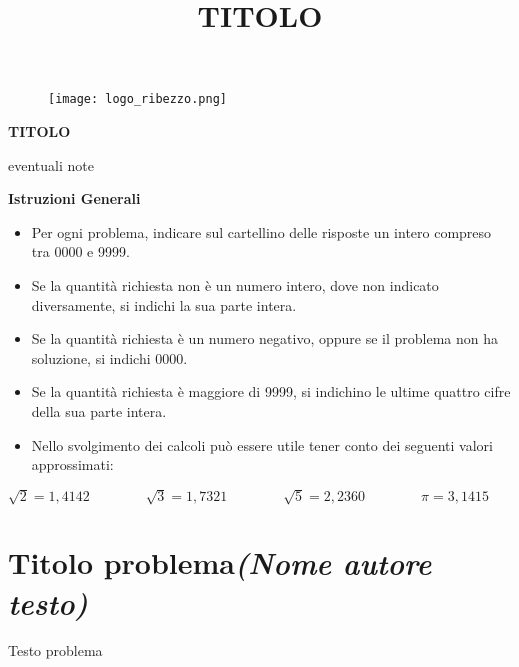 \documentclass[11pt]{article}
\date{}
\title{\textbf{TITOLO}}
\begin{document}
\begin{figure}
       \centering
       \texttt{[image: logo\_ribezzo.png]}
\end{figure}
\begin{center}
\huge\textbf{TITOLO}
\end{center}
\begin{center}
eventuali note


\end{center}
\begin{mdframed}
\begin{center}
\textbf{Istruzioni Generali}
\end{center}
\begin{itemize}
\item Per ogni problema, indicare sul cartellino delle risposte un intero compreso tra 0000 e 9999.
\item Se la quantità richiesta non è un numero intero, dove non indicato diversamente, si indichi la sua parte intera.
\item Se la quantità richiesta è un numero negativo, oppure se il problema non ha soluzione, si indichi 0000.
\item Se la quantità richiesta è maggiore di 9999, si indichino le ultime quattro cifre della sua parte intera.
\item Nello svolgimento dei calcoli può essere utile tener conto dei seguenti valori approssimati:
\end{itemize}

\begin{center}
$\sqrt2 = 1,4142 \qquad \qquad \sqrt3 = 1,7321 \qquad \qquad \sqrt5 = 2,2360 \qquad \qquad \pi = 3,1415$
\end{center}
\end{mdframed}

\section{Titolo problema\hfill\normalsize\normalfont \emph{(Nome autore testo)}}
Testo problema
\end{document}
